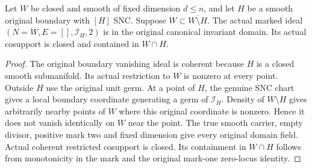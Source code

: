 \begin{lemma}
\label{hir:sharp-single-boundary-trace-original-domain}
\leanok
Let $W$ be closed and smooth of fixed dimension $d\le n$, and let $H$ be
a smooth original boundary with $[H]$ SNC. Suppose
$W\subset\overline{W\setminus H}$. The actual marked ideal
$(N=W,E=[],\mathcal I_H,2)$ is in the original canonical invariant domain.
Its actual cosupport is closed and contained in $W\cap H$.
\end{lemma}
\begin{proof}
The original boundary vanishing ideal is coherent because $H$ is a
closed smooth submanifold. Its actual restriction to $W$ is nonzero at
every point. Outside $H$ use the original unit germ. At a point of $H$,
the genuine SNC chart gives a local boundary coordinate generating a
germ of $\mathcal I_H$. Density of $W\setminus H$ gives arbitrarily nearby
points of $W$ where this original coordinate is nonzero. Hence it does
not vanish identically on $W$ near the point. The true smooth carrier,
empty divisor, positive mark two and fixed dimension give every original
domain field. Actual coherent restricted cosupport is closed. Its
containment in $W\cap H$ follows from monotonicity in the mark and the
original mark-one zero-locus identity.
\end{proof}

